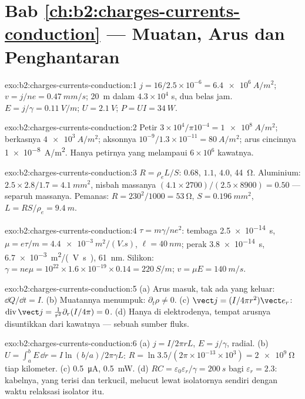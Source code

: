 \section*{Bab \ref{ch:b2:charges-currents-conduction} --- Muatan, Arus dan Penghantaran}

\begin{solution}{exo:b2:charges-currents-conduction:1}
$j = 16/2.5 \times 10^{-6} = \qty{6.4e6}{A/m^2}$; $v = j/ne = \qty{0.47}{mm/s}$; \qty{20}{m}
dalam $4.3 \times 10^4$ s, dua belas jam. $E = j/\gamma = \qty{0.11}{V/m}$; $U = \qty{2.1}{V}$;
$P = UI = \qty{34}{W}$.
\end{solution}

\begin{solution}{exo:b2:charges-currents-conduction:2}
Petir $3 \times 10^4/\pi10^{-4} = \qty{1e8}{A/m^2}$; berkasnya $\qty{4e3}{A/m^2}$; aksonnya
$10^{-9}/1.3 \times 10^{-11} = \qty{80}{A/m^2}$; arus cincinnya \qty{1e-8}{A/m^2}. Hanya
petirnya yang melampaui $6 \times 10^6$ kawatnya.
\end{solution}

\begin{solution}{exo:b2:charges-currents-conduction:3}
$R = \rho_eL/S$: $0.68$, $1.1$, $4.0$, \qty{44}{\ohm}. Aluminium: $2.5 \times 2.8/1.7 =
\qty{4.1}{mm^2}$, nisbah massanya $(4.1 \times 2700)/(2.5 \times 8900) = 0.50$ --- separuh massanya.
Pemanas: $R = 230^2/1000 = \qty{53}{\ohm}$, $S = \qty{0.196}{mm^2}$, $L = RS/\rho_e = \qty{9.4}{m}$.
\end{solution}

\begin{solution}{exo:b2:charges-currents-conduction:4}
$\tau = m\gamma/ne^2$: tembaga \qty{2.5e-14}{s}, $\mu = e\tau/m = \qty{4.4e-3}{m^2/(V.s)}$,
$\ell = \qty{40}{nm}$; perak \qty{3.8e-14}{s}, \qty{6.7e-3}{m^2/(V.s)}, \qty{61}{nm}.
Silikon: $\gamma = ne\mu = 10^{22} \times 1.6 \times 10^{-19} \times 0.14 = \qty{220}{S/m}$; $v =
\mu E = \qty{140}{m/s}$.
\end{solution}

\begin{solution}{exo:b2:charges-currents-conduction:5}
(a) Arus masuk, tak ada yang keluar: $\dd Q/\dd t = I$. (b) Muatannya menumpuk: $\partial_t
\rho \ne 0$. (c) $\vect j = (I/4\pi r^2)\vect e_r$: $\operatorname{div}\vect j = \frac1{r^2}
\partial_r(I/4\pi) = 0$. (d) Hanya di elektrodenya, tempat arusnya
disuntikkan dari kawatnya --- sebuah sumber fluks.
\end{solution}

\begin{solution}{exo:b2:charges-currents-conduction:6}
(a) $j = I/2\pi rL$, $E = j/\gamma$, radial. (b) $U = \int_a^bE\,\dd r = I\ln(b/a)/
2\pi\gamma L$: $R = \ln3.5/(2\pi \times 10^{-13} \times 10^3) = \qty{2e9}{\ohm}$ tiap kilometer.
(c) \qty{0.5}{\micro A}, \qty{0.5}{mW}. (d) $RC = \varepsilon_0\varepsilon_r/\gamma = \qty{200}{s}$ bagi
$\varepsilon_r = 2.3$: kabelnya, yang terisi dan terkucil, melucut lewat
isolatornya sendiri dengan waktu relaksasi isolator itu.
\end{solution}

